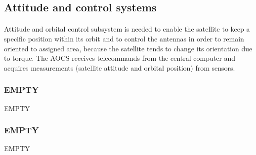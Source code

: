 \subsection{Attitude and control systems}

\paragraph{}Attitude and orbital control subsystem is needed to enable the satellite to keep a specific position within its orbit and to control the antennas in order to remain oriented to assigned area, because the satellite tends to change its orientation due to torque. The AOCS receives telecommands from the central computer and acquires measurements (satellite attitude and orbital position) from sensors.


\subsubsection{EMPTY}
EMPTY
\subsubsection{EMPTY}
EMPTY
